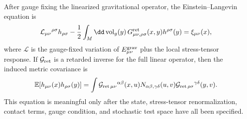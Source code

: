 After gauge fixing the linearized gravitational operator, the
Einstein--Langevin equation is
\begin{equation}
  \mathcal L_{\mu\nu}{}^{\rho\sigma}h_{\rho\sigma}
  -
  \frac12\int_M\dd\operatorname{vol}_g(y)\,
  G^{\rm ret}_{\mu\nu,\rho\sigma}(x,y)h^{\rho\sigma}(y)
  =
  \xi_{\mu\nu}(x),
  \label{eq:semiclassical-einstein-langevin}
\end{equation}
where \(\mathcal L\) is the gauge-fixed variation of
\(E_{\mu\nu}^{\rm grav}\) plus the local stress-tensor response.  If
\(\mathcal G_{\rm ret}\) is a retarded inverse for the full linear operator,
then the induced metric covariance is
\begin{equation}
  \mathbb E[h_{\mu\nu}(x)h_{\rho\sigma}(y)]
  =
  \int
  \mathcal G_{{\rm ret}\,\mu\nu}{}^{\alpha\beta}(x,u)
  N_{\alpha\beta,\gamma\delta}(u,v)
  \mathcal G_{{\rm ret}\,\rho\sigma}{}^{\gamma\delta}(y,v).
  \label{eq:semiclassical-metric-covariance}
\end{equation}
This equation is meaningful only after the state, stress-tensor
renormalization, contact terms, gauge condition, and stochastic test space
have all been specified.

